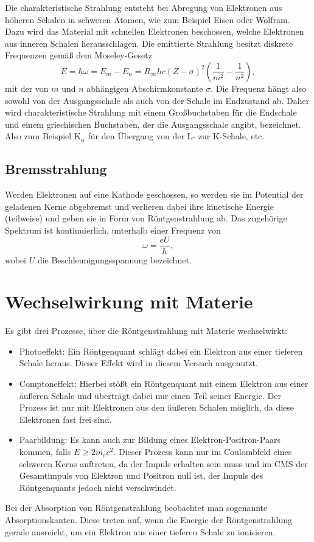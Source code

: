 Die charakteristische Strahlung entsteht bei Abregung von Elektronen aus höheren Schalen in schweren Atomen, wie zum Beispiel Eisen oder Wolfram. Dazu wird das Material mit schnellen Elektronen beschossen, welche Elektronen aus inneren Schalen herausschlagen.
Die emittierte Strahlung besitzt diskrete Frequenzen gemäß dem Moseley-Gesetz \cite{litmap}
\begin{equation}
 E = \hbar\omega = E_{m}-E_{n} = R_{\infty}hc\left(Z-\sigma\right)^{2}\left(\frac{1}{m^{2}}-\frac{1}{n^{2}}\right),
\end{equation}
mit der von $m$ und $n$ abhängigen Abschirmkonstante $\sigma$.
Die Frequenz hängt also sowohl von der Ausgangsschale als auch von der Schale im Endzustand ab. Daher wird charakteristische Strahlung mit einem Großbuchstaben für die Endschale und einem griechischen Buchstaben, der die Ausgangsschale angibt, bezeichnet.
Also zum Beispiel K$_{\alpha}$ für den Übergang von der L- zur K-Schale, etc.

\subsection{Bremsstrahlung}

Werden Elektronen auf eine Kathode geschossen, so werden sie im Potential der geladenen Kerne abgebremst und verlieren dabei ihre kinetische Energie (teilweise) und geben sie in Form von Röntgenstrahlung ab.
Das zugehörige Spektrum ist kontinuierlich, unterhalb einer Frequenz von
\begin{equation}
 \omega = \frac{eU}{\hbar},
\end{equation}
wobei $U$ die Beschleunigungsspannung bezeichnet.

\section{Wechselwirkung mit Materie}

Es gibt drei Prozesse, über die Röntgenstrahlung mit Materie wechselwirkt: \cite{Dem16}
\begin{itemize}
 \item Photoeffekt: Ein Röntgenquant schlägt dabei ein Elektron aus einer tieferen Schale heraus. Dieser Effekt wird in diesem Versuch ausgenutzt.
 \item Comptoneffekt: Hierbei stößt ein Röntgenquant mit einem Elektron aus einer äußeren Schale und überträgt dabei nur einen Teil seiner Energie. Der Prozess ist nur mit Elektronen aus den äußeren Schalen möglich, da diese Elektronen fast frei sind. 
 \item Paarbildung: Es kann auch zur Bildung eines Elektron-Positron-Paars kommen, falls $E\geq 2m_{e}c^{2}$. Dieser Prozess kann nur im Coulombfeld eines schweren Kerns auftreten, da der Impuls erhalten sein muss und im CMS der Gesamtimpuls von Elektron und Positron null ist, der Impuls des Röntgenquants jedoch nicht verschwindet.
\end{itemize}
Bei der Absorption von Röntgenstrahlung beobachtet man sogenannte Absorptionskanten. Diese treten auf, wenn die Energie der Röntgenstrahlung gerade ausreicht, um ein Elektron aus einer tieferen Schale zu ionisieren.

